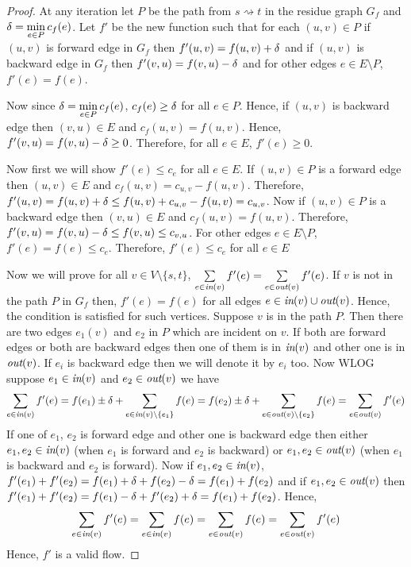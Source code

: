 \begin{proof}
	At any iteration  let $P$ be the path from $s\rightsquigarrow t$ in the residue graph $G_f$ and $\delta=\min\limits_{e\in P}c_f(e)$. Let $f'$ be the new function such that for each $(u,v)\in P$ if $(u,v)$ is forward edge in $G_f$ then $f'(u,v)=f(u,v)+\delta$ and if $(u,v)$ is backward edge in $G_f$ then $f'(v,u)=f(v,u)-\delta$ and for other edges $e\in E\setminus P$, $f'(e)=f(e)$.

	Now since $\delta=\min\limits_{e\in P}c_f(e)$, $c_f(e)\geq \delta$ for all $e\in P$. Hence, if $(u,v)$ is backward edge then $(v,u)\in E$ and $c_f(u,v)=f(u,v)$. Hence, $f'(v,u)=f(v,u)-\delta\geq 0$. Therefore, for all $e\in E$, $f'(e)\geq 0$.

	Now first we will show $f'(e)\leq c_e$ for all $e\in E$. If $(u,v)\in P$ is a forward edge then $(u,v)\in E$ and $c_f(u,v)=c_{u,v}-f(u,v)$. Therefore, $f'(u,v)=f(u,v)+\delta\leq f(u,v)+c_{u,v}-f(u,v)=c_{u,v}$. Now if $(u,v)\in P$ is a backward edge then $(v,u)\in E$ and $c_f(u,v)=f(u,v)$. Therefore, $f'(v,u)=f(v,u)-\delta\leq f(v,u)\leq c_{v,u}$. For other edges $e\in E\setminus P$, $f'(e)=f(e)\leq c_e$. Therefore, $f'(e)\leq c_e$ for all $e\in E$

	Now we will prove for all $v\in V\setminus\{s,t\}$, $\sum\limits_{e\in \emph{in}(v)}f'(e)=\sum\limits_{e\in\emph{out}(v)}f'(e)$. If $v$ is not in the path $P$ in $G_f$ then, $f'(e)=f(e)$ for all edges $e\in \emph{in}(v)\cup \emph{out}(v)$. Hence, the condition is satisfied for such vertices. Suppose $v$ is in the path $P$. Then there are two edges $e_1(v)$ and $e_2$ in $P$ which are incident on $v$. If both are forward edges or both are backward edges then one of them is in $\emph{in}(v)$ and other one is in $\emph{out}(v)$. If $e_i$ is backward edge then we will denote it by $e_i$ too. Now WLOG suppose $e_1\in \emph{in}(v)$ and $e_2\in\emph{out}(v)$ we have 
	$$\sum\limits_{e\in \emph{in}(v)}f'(e)=f(e_1)\pm \delta+\sum\limits_{e\in \emph{in}(v)\setminus\{e_1\}}f(e)=f(e_2)\pm \delta+\sum\limits_{e\in\emph{out}(v)\setminus \{e_2\}}f(e)=\sum\limits_{e\in\emph{out}(v)}f'(e)$$
	If one of $e_1$, $e_2$ is forward edge and other one is backward edge then either $e_1,e_2\in \emph{in}(v)$ (when $e_1$ is forward and $e_2$ is backward) or $e_1,e_2\in \emph{out}(v)$ (when $e_1$ is backward and $e_2$ is forward). Now if $e_1,e_2\in \emph{in}(v)$, $f'(e_1)+f'(e_2)=f(e_1)+\delta+f(e_2)-\delta=f(e_1)+f(e_2)$ and if $e_1,e_2\in\emph{out}(v)$ then $f'(e_1)+f'(e_2)=f(e_1)-\delta+f'(e_2)+\delta=f(e_1)+f(e_2)$. Hence, $$\sum\limits_{e\in \emph{in}(v)}f'(e)=\sum\limits_{e\in \emph{in}(v)}f(e)=\sum\limits_{e\in\emph{out}(v)}f(e)=\sum\limits_{e\in\emph{out}(v)}f'(e)$$ Hence, $f'$ is a valid flow.
\end{proof}

